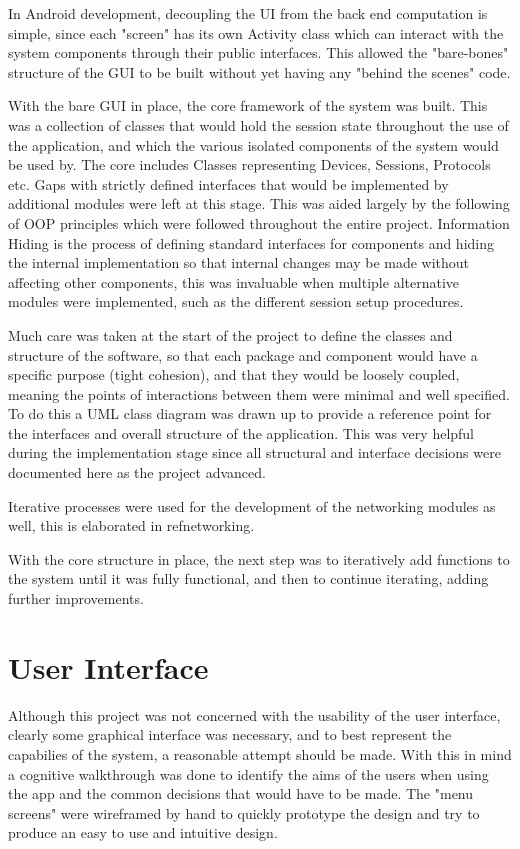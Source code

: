 In Android development, decoupling the UI from the back end computation is simple, since each "screen" has its own Activity class which can interact with the system components through their public interfaces. This allowed the "bare-bones" structure of the GUI to be built without yet having any "behind the scenes" code.

With the bare GUI in place, the core framework of the system was built. This was a collection of classes that would hold the session state throughout the use of the application, and which the various isolated components of the system would be used by. The core includes Classes representing Devices, Sessions, Protocols etc.
Gaps with strictly defined interfaces that would be implemented by additional modules were left at this stage. This was aided largely by the following of OOP principles which were followed throughout the entire project.
Information Hiding is the process of defining standard interfaces for components and hiding the internal implementation so that internal changes may be made without affecting other components, this was invaluable when multiple alternative modules were implemented, such as the different session setup procedures.

Much care was taken at the start of the project to define the classes and structure of the software, so that each package and component would have a specific purpose (tight cohesion), and that they would be loosely coupled, meaning the points of interactions between them were minimal and well specified. To do this a UML class diagram was drawn up to provide a reference point for the interfaces and overall structure of the application. This was very helpful during the implementation stage since all structural and interface decisions were documented here as the project advanced.

Iterative processes were used for the development of the networking modules as well, this is elaborated in ref{networking}.

With the core structure in place, the next step was to iteratively add functions to the system until it was fully functional, and then to continue iterating, adding further improvements.

\section{User Interface}

Although this project was not concerned with the usability of the user interface, clearly some graphical interface was necessary, and to best represent the capabilies of the system, a reasonable attempt should be made. With this in mind a cognitive walkthrough was done to identify the aims of the users when using the app and the common decisions that would have to be made. The "menu screens" were wireframed by hand to quickly prototype the design and try to produce an easy to use and intuitive design.

